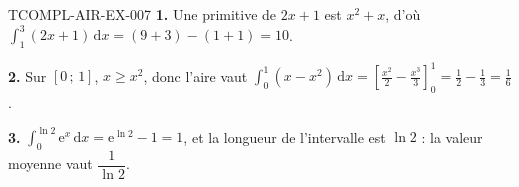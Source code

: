 \begin{corrige}{TCOMPL-AIR-EX-007}
\textbf{1.} Une primitive de $2x+1$ est $x^2+x$, d'où
$\int_1^3(2x+1)\,\mathrm{d}x=(9+3)-(1+1)=10$.

\textbf{2.} Sur $[0\,;\,1]$, $x\geq x^2$, donc l'aire vaut
$\int_0^1(x-x^2)\,\mathrm{d}x=\left[\tfrac{x^2}{2}-\tfrac{x^3}{3}\right]_0^1
=\tfrac12-\tfrac13=\tfrac16$.

\textbf{3.} $\int_0^{\ln2}\mathrm{e}^x\,\mathrm{d}x=\mathrm{e}^{\ln2}-1=1$,
et la longueur de l'intervalle est $\ln2$ : la valeur moyenne vaut
$\dfrac{1}{\ln2}$.
\end{corrige}
